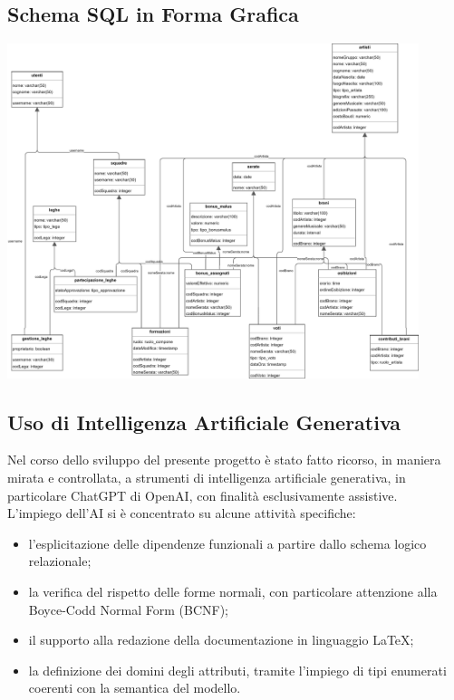\documentclass[a4paper,12pt]{article}
\begin{document}
\subsection{Schema SQL in Forma Grafica}
\begin{center}
	\includegraphics[width=0.9\textwidth]{fantasanremo.eps}
\end{center}



\subsection{Uso di Intelligenza Artificiale Generativa}
Nel corso dello sviluppo del presente progetto è stato fatto ricorso, in maniera mirata e controllata, a strumenti di intelligenza artificiale generativa, in particolare ChatGPT di OpenAI, con finalità esclusivamente assistive.\\
L’impiego dell’AI si è concentrato su alcune attività specifiche:
\begin{itemize}
	\item l’esplicitazione delle dipendenze funzionali a partire dallo schema logico relazionale;
	\item la verifica del rispetto delle forme normali, con particolare attenzione alla Boyce-Codd Normal Form (BCNF);
	\item il supporto alla redazione della documentazione in linguaggio \LaTeX;
	\item la definizione dei domini degli attributi, tramite l’impiego di tipi enumerati coerenti con la semantica del modello.
\end{itemize}
\end{document}
